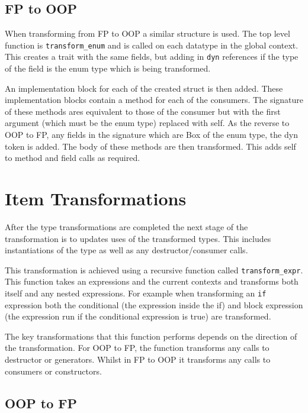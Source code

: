 \documentclass[ oneside,%
                    author={James Elgar},
                    degree={MEng},
                     title={Bidirectional transformer between functional and \\ object-oriented programming in Rust},
                  subtitle={}]{dissertation}
\begin{document}
\subsection{FP to OOP}

When transforming from FP to OOP a similar structure is used. The top level function is \verb|transform_enum| and is called on each datatype in the global context. This creates a trait with the same fields, but adding in \verb|dyn| references if the type of the field is the enum type which is being transformed.

An implementation block for each of the created struct is then added. These implementation blocks contain a method for each of the consumers. The signature of these methods ares equivalent to those of the consumer but with the first argument (which must be the enum type) replaced with self. 
As the reverse to OOP to FP, any fields in the signature which are Box of the enum type, the dyn token is added.
The body of these methods are then transformed. This adds self to method and field calls as required.


\section{Item Transformations}
\label{sec:item-trans}

After the type transformations are completed the next stage of the transformation is to updates uses of the transformed types. This includes instantiations of the type as well as any destructor/consumer calls.

This transformation is achieved using a recursive function called \verb|transform_expr|. This function takes an expressions and the current contexts and transforms both itself and any nested expressions. For example when transforming an \verb|if| expression both the conditional (the expression inside the if) and block expression (the expression run if the conditional expression is true) are transformed.

The key transformations that this function performs depends on the direction of the transformation. For OOP to FP, the function transforms any calls to destructor or generators. Whilst in FP to OOP it transforms any calls to consumers or constructors.

\subsection{OOP to FP}
\end{document}
